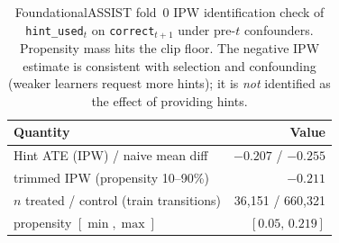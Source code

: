 \begin{table}[htbp]
\caption{FoundationalASSIST fold~0 IPW identification check of
\texttt{hint\_used}$_t$ on \texttt{correct}$_{t+1}$ under pre-$t$
confounders. Propensity mass hits the clip floor. The negative IPW
estimate is consistent with selection and confounding (weaker learners
request more hints); it is \emph{not} identified as the effect of
providing hints.}
\label{tab:hint-ate}
\centering
\begin{tabular}{@{}lr@{}}
\toprule
Quantity & Value \\
\midrule
Hint ATE (IPW) / naive mean diff & $-0.207$ / $-0.255$ \\
\quad trimmed IPW (propensity 10--90\%) & $-0.211$ \\
\quad $n$ treated / control (train transitions) & 36{,}151 / 660{,}321 \\
\quad propensity $[\min,\max]$ & $[0.05,\,0.219]$ \\
\bottomrule
\end{tabular}
\end{table}
